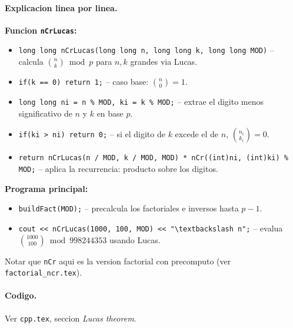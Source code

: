 \paragraph{Explicacion linea por linea.}
\textbf{Funcion \texttt{nCrLucas}:}
\begin{itemize}\setlength\itemsep{0pt}
	\item \verb|long long nCrLucas(long long n, long long k, long long MOD)| -- calcula $\binom{n}{k} \bmod p$ para $n, k$ grandes via Lucas.
	\item \verb|if(k == 0) return 1;| -- caso base: $\binom{n}{0} = 1$.
	\item \verb|long long ni = n % MOD, ki = k % MOD;| -- extrae el digito menos significativo de $n$ y $k$ en base $p$.
	\item \verb|if(ki > ni) return 0;| -- si el digito de $k$ excede el de $n$, $\binom{n_i}{k_i}=0$.
	\item \verb|return nCrLucas(n / MOD, k / MOD, MOD) * nCr((int)ni, (int)ki) % MOD;| -- aplica la recurrencia: producto sobre los digitos.
\end{itemize}
\textbf{Programa principal:}
\begin{itemize}\setlength\itemsep{0pt}
	\item \verb|buildFact(MOD);| -- precalcula los factoriales e inversos hasta $p-1$.
	\item \verb|cout << nCrLucas(1000, 100, MOD) << "\textbackslash n";| -- evalua $\binom{1000}{100} \bmod 998244353$ usando Lucas.
\end{itemize}
Notar que \texttt{nCr} aqui es la version factorial con precomputo (ver \texttt{factorial\_ncr.tex}).

\paragraph{Codigo.}
Ver \texttt{cpp.tex}, seccion \textit{Lucas theorem}.

\vspace{0.5em|||}

